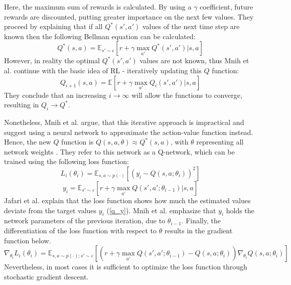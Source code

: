 Here, the maximum sum of rewards is calculated. By using a $\gamma$ coefficient, future rewards are discounted, putting greater importance on the next few values. They proceed by explaining that if all $Q^*(s',a')$ values of the next time step are known then the following Bellman equation can be calculated:
\begin{equation}\label{opt_qvalue}
    Q^*(s,a) = \mathbb{E}_{s'\sim \epsilon} \left[ r + \gamma \max_{a'} Q^*(s',a') | s,a \right]
\end{equation}
However, in reality the optimal $Q^*(s',a')$ values are not known, thus Mnih et al. continue with the basic idea of RL - iteratively updating this $Q$ function:
\begin{equation}\label{qvalue_i}
    Q_{i+1}(s,a)= \mathbb{E} \left[ r + \gamma \max_{a'} Q_i(s',a') | s,a \right]
\end{equation}
They conclude that an increasing $i\rightarrow \infty$ will allow the functions to converge, resulting in $Q_i\rightarrow Q^*$.

Nonetheless, Mnih et al. argue, that this iterative approach is impractical and suggest using a neural network to approximate the action-value function instead. Hence, the new $Q$ function is $Q(s,a,\theta)\approx Q^*(s,a)$, with $\theta$ representing all network weights \cite{jaja19}. They refer to this network as a Q-network, which can be trained using the following loss function:
\begin{equation}\label{q_loss}
    L_i(\theta_i) = \mathbb{E}_{s,a \sim p(\cdot)} \left[ (y_i - Q(s,a;\theta_i))^2 \right]
\end{equation}
\begin{equation}\label{q_y}
    y_i = \mathbb{E}_{s' \sim \varepsilon } \left[ r + \gamma \max_{a'} Q(s',a'; \theta_{i-1}) | s,a \right]
\end{equation}
Jafari et al. \cite{jaja19} explain that the loss function shows how much the estimated values deviate from the target values $y_i$ (\ref{q_y}). Mnih et al. emphasize that $y_i$ holds the network parameters of the previous iteration, due to $\theta_{i-1}$. Finally, the differentiation of the loss function with respect to $\theta$ results in the gradient function below.
\begin{equation}\label{q_gradient}
    \nabla_{\theta_i} L_i(\theta_i) = \mathbb{E}_{s,a \sim p(\cdot);s' \sim \varepsilon } \left[\left( r + \gamma \max_{a'} Q(s',a'; \theta_{i-1}) - Q(s,a;\theta_i) \right) \nabla_{\theta_i} Q(s,a;\theta_i) \right]
\end{equation}
Nevertheless, in most cases it is sufficient to optimize the loss function through stochastic gradient descent.

